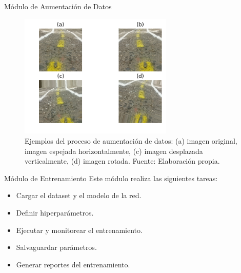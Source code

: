 \documentclass[10pt]{beamer}
\begin{document}
\begin{frame}{Módulo de Aumentación de Datos}
    \begin{figure}[!h] 
        \centering
        \includegraphics[width=0.65\textwidth]{../img/aumentacion}
        \caption[Ejemplos de aumentación de datos]{Ejemplos del proceso de aumentación de datos: (a) imagen original, 
        imagen espejada horizontalmente, (c) imagen desplazada verticalmente, (d) imagen rotada. Fuente: Elaboración propia. }
    \end{figure}

\end{frame}


\begin{frame}{Módulo de Entrenamiento}
    Este módulo realiza las siguientes tareas:

    \begin{itemize}
        \item Cargar el dataset y el modelo de la red.
        \item Definir hiperparámetros.
        \item Ejecutar y monitorear el entrenamiento.
        \item Salvaguardar parámetros.
        \item Generar reportes del entrenamiento.
    \end{itemize}
\end{frame}
\end{document}
